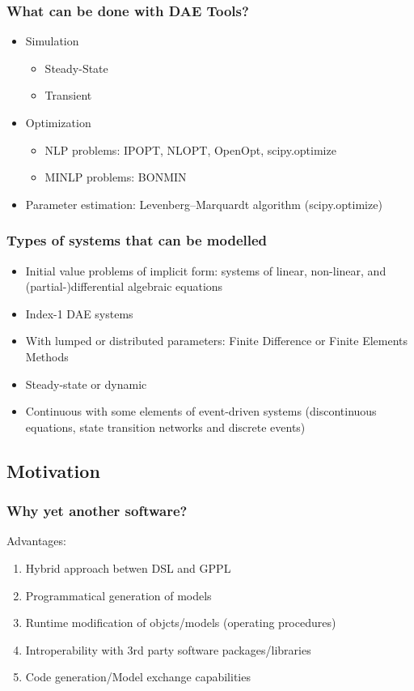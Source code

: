 \documentclass{beamer}
\begin{document}
\begin{frame}
\frametitle{What can be done with DAE Tools?} 
\begin{itemize}
  \item Simulation
    \begin{itemize}
      \item Steady-State 
      \item Transient
    \end{itemize}
  \item Optimization
    \begin{itemize}
      \item NLP problems: IPOPT, NLOPT, OpenOpt, scipy.optimize
      \item MINLP problems: BONMIN
    \end{itemize}
  \item Parameter estimation: Levenberg–Marquardt algorithm (scipy.optimize)
\end{itemize}
\end{frame}

\begin{frame}
\frametitle{Types of systems that can be modelled}
\begin{itemize}
  \item Initial value problems of implicit form: systems of linear, non-linear, and (partial-)differential algebraic equations
  \item Index-1 DAE systems
  \item With lumped or distributed parameters: Finite Difference or Finite Elements Methods
  \item Steady-state or dynamic
  \item Continuous with some elements of event-driven systems (discontinuous equations, state transition networks and discrete events) 
\end{itemize}
\end{frame}

\subsection{Motivation}
\begin{frame}
\frametitle{Why yet another software?}
Advantages:
\begin{enumerate}
  \item Hybrid approach betwen DSL and GPPL
  \item Programmatical generation of models
  \item Runtime modification of objcts/models (operating procedures)
  \item Introperability with 3rd party software packages/libraries
  \item Code generation/Model exchange capabilities
\end{enumerate}
\end{frame}
\end{document}
